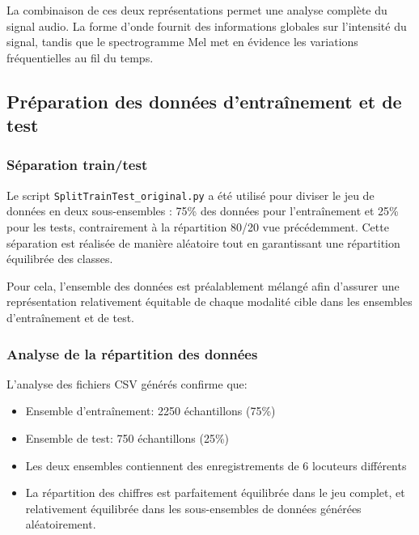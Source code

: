\documentclass{article}
\begin{document}
La combinaison de ces deux représentations permet une analyse complète du signal audio. La forme d’onde fournit des informations globales sur l’intensité du signal, tandis que le spectrogramme Mel met en évidence les variations fréquentielles au fil du temps.

\subsection{Préparation des données d'entraînement et de test}
\label{sec:preparation}

\subsubsection{Séparation train/test}
\label{subsec:split}

Le script \texttt{SplitTrainTest\_original.py} a été utilisé pour diviser le jeu de données en deux sous-ensembles : 75\% des données pour l'entraînement et 25\% pour les tests, contrairement à la répartition 80/20 vue précédemment. Cette séparation est réalisée de manière aléatoire tout en garantissant une répartition équilibrée des classes. 

Pour cela, l'ensemble des données est préalablement mélangé afin d'assurer une représentation relativement équitable de chaque modalité cible dans les ensembles d'entraînement et de test.

\subsubsection{Analyse de la répartition des données}
\label{subsec:analyse_repartition}

L'analyse des fichiers CSV générés confirme que:
\begin{itemize}
    \item Ensemble d'entraînement: 2250 échantillons (75\%)
    \item Ensemble de test: 750 échantillons (25\%)
    \item Les deux ensembles contiennent des enregistrements de 6 locuteurs différents
    \item La répartition des chiffres est parfaitement équilibrée dans le jeu complet, et relativement équilibrée dans les sous-ensembles de données générées aléatoirement. 
\end{itemize}
\end{document}
